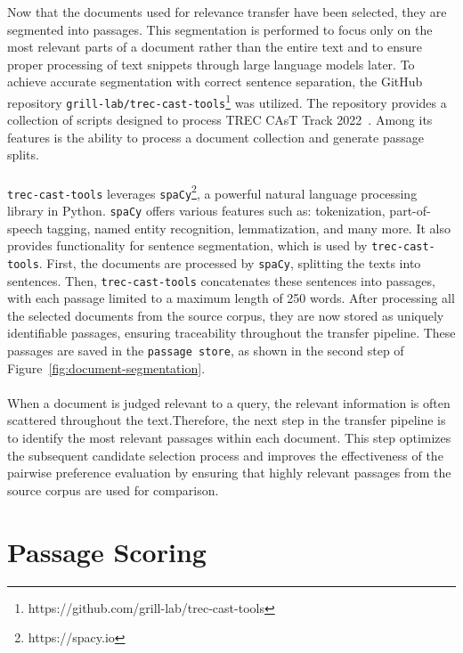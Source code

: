 Now that the documents used for relevance transfer have been selected, they are segmented into passages. This segmentation is performed to focus only on the most relevant parts of a document rather than the entire text and to ensure proper processing of text snippets through large language models later. To achieve accurate segmentation with correct sentence separation, the GitHub repository \texttt{grill-lab/trec-cast-tools}\footnote{https://github.com/grill-lab/trec-cast-tools} was utilized. The repository provides a collection of scripts designed to process TREC CAsT Track 2022~\citep{owoicho:2022}. Among its features is the ability to process a document collection and generate passage splits.
\\\\
\texttt{trec-cast-tools} leverages \texttt{spaCy}\footnote{https://spacy.io}, a powerful natural language processing library in Python. \texttt{spaCy} offers various features such as: tokenization, part-of-speech tagging, named entity recognition, lemmatization, and many more. It also provides functionality for sentence segmentation, which is used by \texttt{trec-cast-tools}. First, the documents are processed by \texttt{spaCy}, splitting the texts into sentences. Then, \texttt{trec-cast-tools} concatenates these sentences into passages, with each passage limited to a maximum length of 250 words. After processing all the selected documents from the source corpus, they are now stored as uniquely identifiable passages, ensuring traceability throughout the transfer pipeline. These passages are saved in the \texttt{passage store}, as shown in the second step of Figure~\ref{fig:document-segmentation}.
\\\\
When a document is judged relevant to a query, the relevant information is often scattered throughout the text.Therefore, the next step in the transfer pipeline is to identify the most relevant passages within each document. This step optimizes the subsequent candidate selection process and improves the effectiveness of the pairwise preference evaluation by ensuring that highly relevant passages from the source corpus are used for comparison.
\pagebreak


\section{Passage Scoring}\label{passage-scoring}

